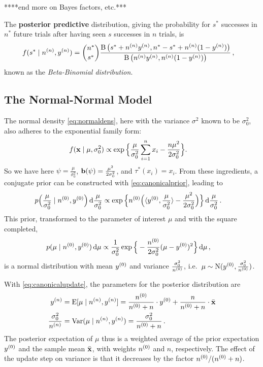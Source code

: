 ****end more on Bayes factors, etc.***

The \textbf{posterior predictive} distribution, giving the probability for $s^*$ successes in $n^*$ future trials
after having seen $s$ successes in $n$ trials, is
\begin{align*}
f(s^* \mid n^{(n)}, y^{(n)}) &= {n^* \choose s^*} \frac{\operatorname{B}\big(s^* + n^{(n)} y^{(n)}, n^* - s^* + n^{(n)} (1 - y^{(n)})\big)}{\operatorname{B}\big(n^{(n)}y^{(n)}, n^{(n)} (1 - y^{(n)})\big)}\,,
\end{align*}
known as the \emph{Beta-Binomial distribution}.


\subsection{The Normal-Normal Model}
\label{sec:norm-norm}

The normal density \eqref{eq:normaldens}, here with the variance $\sigma^2$ known to be $\sigma^2_0$,
also adheres to the exponential family form:
\begin{align*}
f(\mathbf{x} \mid \mu, \sigma_0^2)
 &\propto \exp\Big\{ \frac{\mu}{\sigma_0^2} \sum_{i=1}^n x_i - \frac{n\mu^2}{2\sigma_0^2} \Big\}.
\end{align*}
So we have here $\psi = \frac{\mu}{\sigma_0^2}$, $\mathbf{b}(\psi) = \frac{\mu^2}{2\sigma_0^2}$, and $\tau^*(x_i) = x_i$.
From these ingredients, a conjugate prior can be constructed with \eqref{eq:canonicalprior}, leading to
\begin{align*}
p\Big(\frac{\mu}{\sigma_0^2} \mid n^{(0)}, y^{(0)}\Big) \,\mathrm{d}\frac{\mu}{\sigma_0^2}
 &\propto \exp\Big\{ n^{(0)} \Big( \langle y^{(0)}, \frac{\mu}{\sigma_0^2} \rangle - \frac{\mu^2}{2\sigma_0^2} \Big) \Big\} \,\mathrm{d}\frac{\mu}{\sigma_0^2}\,.
\end{align*}
This prior, transformed to the parameter of interest $\mu$ and with the square completed,
\begin{align*}
p(\mu \mid n^{(0)}, y^{(0)}) \,\mathrm{d}\mu
 &\propto \frac{1}{\sigma_0^2} \exp\Big\{ -\frac{n^{(0)}}{2\sigma_0^2} (\mu - y^{(0)})^2 \Big\} \,\mathrm{d}\mu\,,
\end{align*}
is a normal distribution with mean $y^{(0)}$ and variance $\frac{\sigma_0^2}{n^{(0)}}$,
i.e.\ $\mu \sim \operatorname{N}(y^{(0)}, \frac{\sigma_0^2}{n^{(0)}})$.

With \eqref{eq:canonicalupdate}, the parameters for the posterior distribution are
\begin{align}
y^{(n)} &= \operatorname{E}[\mu\mid n^{(n)}, y^{(n)}] = \frac{n^{(0)}}{n^{(0)} + n} \cdot y^{(0)} + \frac{n}{n^{(0)} + n} \cdot \bar{\mathbf{x}} \label{eq:normalposte}\\
\frac{\sigma_0^2}{n^{(n)}} &= \operatorname{Var}(\mu\mid n^{(n)}, y^{(n)}) = \frac{\sigma_0^2}{n^{(0)} + n}\,. \label{eq:normalpostvar}
\end{align}
The posterior expectation of $\mu$ thus is a weighted average of the prior expectation $y^{(0)}$ and the sample mean $\bar{\mathbf{x}}$,
with weights $n^{(0)}$ and $n$, respectively.
The effect of the update step on variance is that it decreases by the factor $n^{(0)}/(n^{(0)}+n)$.

